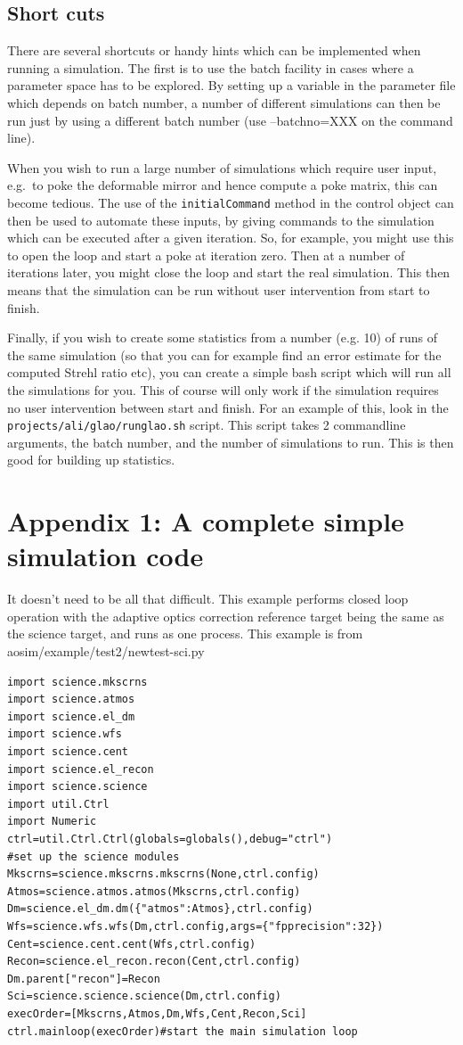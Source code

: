 \documentclass{article}
\begin{document}
\subsection{Short cuts}
There are several shortcuts or handy hints which can be implemented
when running a simulation.  The first is to use the batch facility in
cases where a parameter space has to be explored.  By setting up a
variable in the parameter file which depends on batch number, a number
of different simulations can then be run just by using a different
batch number (use --batchno=XXX on the command line).

When you wish to run a large number of simulations which require user
input, e.g.\ to poke the deformable mirror and hence compute a poke
matrix, this can become tedious.  The use of the
\texttt{initialCommand} method in the control object can then be used
to automate these inputs, by giving commands to the simulation which
can be executed after a given iteration.  So, for example, you might
use this to open the loop and start a poke at iteration zero.  Then at
a number of iterations later, you might close the loop and start the
real simulation.  This then means that the simulation can be run
without user intervention from start to finish.  

Finally, if you wish to create some statistics from a number (e.g. 10)
of runs of the same simulation (so that you can for example find an
error estimate for the computed Strehl ratio etc), you can create a
simple bash script which will run all the simulations for you.  This
of course will only work if the simulation requires no user
intervention between start and finish.  For an example of this, look
in the \texttt{projects/ali/glao/runglao.sh} script.  This script
takes 2 commandline arguments, the batch number, and the number of
simulations to run.  This is then good for building up statistics.


\appendix
\section*{Appendix 1:  A complete simple simulation code}
It doesn't need to be all that difficult.  This example performs
closed loop operation with the adaptive optics correction reference
target being the same as the science target, and runs as one process.
This example is from aosim/example/test2/newtest-sci.py
\begin{verbatim}
import science.mkscrns
import science.atmos
import science.el_dm
import science.wfs
import science.cent
import science.el_recon
import science.science
import util.Ctrl
import Numeric
ctrl=util.Ctrl.Ctrl(globals=globals(),debug="ctrl")
#set up the science modules
Mkscrns=science.mkscrns.mkscrns(None,ctrl.config)
Atmos=science.atmos.atmos(Mkscrns,ctrl.config)
Dm=science.el_dm.dm({"atmos":Atmos},ctrl.config)
Wfs=science.wfs.wfs(Dm,ctrl.config,args={"fpprecision":32})
Cent=science.cent.cent(Wfs,ctrl.config)
Recon=science.el_recon.recon(Cent,ctrl.config)
Dm.parent["recon"]=Recon
Sci=science.science.science(Dm,ctrl.config)
execOrder=[Mkscrns,Atmos,Dm,Wfs,Cent,Recon,Sci]
ctrl.mainloop(execOrder)#start the main simulation loop
\end{verbatim}
\end{document}
